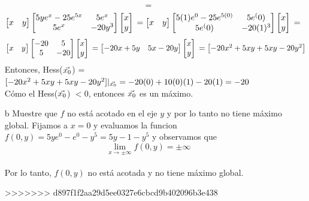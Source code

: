 \documentclass[a4paper,12pt]{article}
\begin{document}
\begin{itemize}
\[	=
	\]
	\[
	\begin{bmatrix}
	x & y
	\end{bmatrix}
	\begin{bmatrix}
	    5ye^x - 25e^{5x} & 5e^x\\
		5e^x & -20y^3\\
	\end{bmatrix}
	\begin{bmatrix}
	x \\ y
	\end{bmatrix}\\
	=
	\begin{bmatrix}
	x & y
	\end{bmatrix}
	\begin{bmatrix}
	    5(1)e^0 - 25e^{5(0)} & 5e^(0)\\
		5e^(0) & -20(1)^3\\
	\end{bmatrix}
	\begin{bmatrix}
	x \\ y
	\end{bmatrix}\\
	=
	\]
	\[
	\begin{bmatrix}
	x & y
	\end{bmatrix}
	\begin{bmatrix}
	    -20 & 5\\
		5 & -20\\
	\end{bmatrix}
	\begin{bmatrix}
	x \\ y
	\end{bmatrix}\\
	=
	\begin{bmatrix}
	-20x + 5y & 5x - 20y
	\end{bmatrix}
	\begin{bmatrix}
	x \\ y
	\end{bmatrix}\\
	=
	\begin{bmatrix}
	-20x^2+5xy+5xy-20y^2
	\end{bmatrix}
	\]
	Entonces, Hess($\vec{x_0}$) = $[-20x^2+5xy+5xy-20y^2]|_{\vec{x_0}} = -20(0)+10(0)(1)-20(1) = -20$\\
	Cómo el Hess($\vec{x_0}$) $< 0$, entonces $\vec{x_0}$ es un máximo.
	\item[b] Muestre que $f$ no está acotado en el eje $y$ y por lo tanto no tiene máximo global.
	Fijamos a $x = 0$ y evaluamos la funcion $f(0,y)= 5ye^0-e^0-y^5 = 5y-1-y^5$ y observamos que \[ \lim_{x \to \pm \infty} f(0,y) = \pm \infty \]\\
	Por lo tanto, $f(0,y)$ no está acotada y no tiene máximo global.

>>>>>>> d897f1f2aa29d5ee0327e6cbcd9b402096b3e438
\end{itemize}
\end{document}
